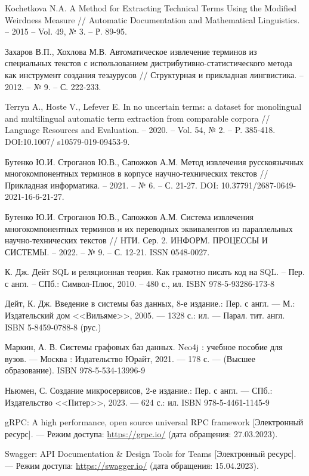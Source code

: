\begin{thebibliography}{}
	Kochetkova N.A. A Method for Extracting Technical Terms Using the Modified Weirdness Measure // Automatic Documentation and Mathematical Linguistics. – 2015 – Vol. 49, № 3. – Р. 89-95.
	
	Захаров В.П., Хохлова М.В. Автоматическое извлечение терминов из специальных текстов с использованием дистрибутивно-статистического метода как инструмент создания тезаурусов // Структурная и прикладная лингвистика. – 2012. – № 9. – С. 222-233.
	
	Terryn A., Hoste V., Lefever E. In no uncertain terms: a dataset for monolingual and multilingual automatic term extraction from comparable corpora // Language Resources and Evaluation. – 2020. – Vol. 54, № 2. – P. 385-418. DOI:10.1007/ s10579-019-09453-9.
	
	Бутенко Ю.И. Строганов Ю.В., Сапожков А.М. Метод извлечения русскоязычных многокомпонентных терминов в корпусе научно-технических текстов // Прикладная информатика. – 2021. – № 6. – С. 21-27. DOI: 10.37791/2687-0649-2021-16-6-21-27.
	
	Бутенко Ю.И. Строганов Ю.В., Сапожков А.М. Система извлечения многокомпонентных терминов и их переводных эквивалентов из параллельных научно-технических текстов // НТИ. Сер. 2. ИНФОРМ. ПРОЦЕССЫ И СИСТЕМЫ. – 2022. – № 9. – С. 12-21. ISSN 0548-0027.
	
	 К. Дж. Дейт
	SQL и реляционная теория. Как грамотно писать код на SQL. – Пер. с англ. – СПб.: Символ-Плюс, 2010. – 480 с., ил. ISBN 978-5-93286-173-8
	
	Дейт, К. Дж. Введение в системы баз данных, 8-е издание.: Пер. с англ. — М.: Издательский дом <<Вильяме>>, 2005. — 1328 с.: ил. — Парал. тит. англ. ISBN 5-8459-0788-8 (рус.)
	
	Маркин, А. В. Системы графовых баз данных. Neo4j : учебное пособие для вузов. — Москва : Издательство Юрайт, 2021. — 178 с. — (Высшее образование). ISBN 978-5-534-13996-9
	
	Ньюмен, С. Создание микросервисов, 2-е издание.: Пер. с англ. — СПб.: Издательство <<Питер>>, 2023. — 624 с.: ил. ISBN 978-5-4461-1145-9
	
	gRPC: A high performance, open source universal RPC framework [Электронный ресурс]. — Режим доступа: \url{https://grpc.io/} (дата обращения: 27.03.2023).
	
	Swagger: API Documentation \& Design Tools for Teams [Электронный ресурс]. — Режим доступа: \url{https://swagger.io/} (дата обращения: 15.04.2023).
	

\end{thebibliography}
